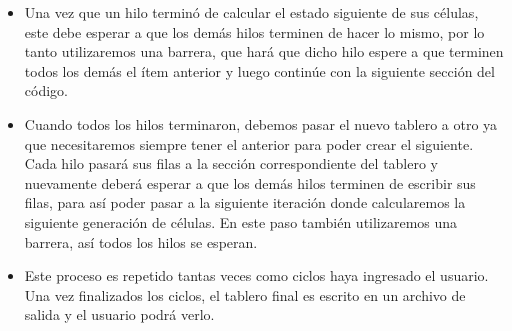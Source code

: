 \documentclass[11pt]{article}
\begin{document}
{\begin{itemize}
            \item Una vez que un hilo terminó de calcular el estado siguiente de sus células, este debe esperar a que los demás hilos terminen de hacer lo mismo, por lo tanto utilizaremos una barrera, que hará que dicho hilo espere a que terminen todos los demás el ítem anterior y luego continúe con la siguiente sección del código.
            \item Cuando todos los hilos terminaron, debemos pasar el nuevo tablero a otro ya que necesitaremos siempre tener el anterior para poder crear el siguiente. Cada hilo pasará sus filas a la sección correspondiente del tablero y nuevamente deberá esperar a que los demás hilos terminen de escribir sus filas, para así poder pasar a la siguiente iteración donde calcularemos la siguiente generación de células. En este paso también utilizaremos una barrera, así todos los hilos se esperan.
            \item Este proceso es repetido tantas veces como ciclos haya ingresado el usuario. Una vez finalizados los ciclos, el tablero final es escrito en un archivo de salida y el usuario podrá verlo.
        \end{itemize}
    }
\end{document}
